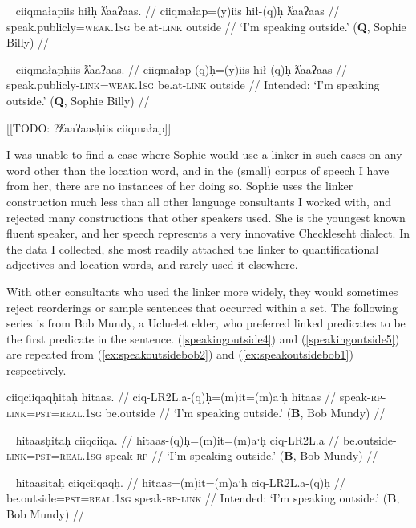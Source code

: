 \ex~ \label{speakingoutside2}
\begingl
\glpreamble ciiqmałapiis hiłḥ ƛ̓aaʔaas. //
\gla ciiqmałap=(y)iis hił-(q)ḥ ƛ̓aaʔaas //
\glb speak.publicly=\textsc{weak.1sg} be.at-\textsc{link} outside //
\glft `I'm speaking outside.' (\textbf{Q}, Sophie Billy) //
\endgl
\xe

\ex~ \label{*speakingoutside3}
\begingl
\glpreamble *ciiqmałapḥiis ƛ̓aaʔaas. //
\gla ciiqmałap-(q)ḥ=(y)iis hił-(q)ḥ ƛ̓aaʔaas //
\glb speak.publicly-\textsc{link}=\textsc{weak.1sg} be.at-\textsc{link} outside //
\glft Intended: `I'm speaking outside.' (\textbf{Q}, Sophie Billy) //
\endgl
\xe

[[TODO: ?ƛ̓aaʔaasḥiis ciiqmałap]]

I was unable to find a case where Sophie would use a linker in such cases on any word other than the location word, and in the (small) corpus of speech I have from her, there are no instances of her doing so. Sophie uses the linker construction much less than all other language consultants I worked with, and rejected many constructions that other speakers used. She is the youngest known fluent speaker, and her speech represents a very innovative Checkleseht dialect. In the data I collected, she most readily attached the linker to quantificational adjectives and location words, and rarely used it elsewhere.

With other consultants who used the linker more widely, they would sometimes reject reorderings or sample sentences that occurred within a set. The following series is from Bob Mundy, a Ucluelet elder, who preferred linked predicates to be the first predicate in the sentence. (\ref{speakingoutside4}) and (\ref{speakingoutside5}) are repeated from (\ref{ex:speakoutsidebob2}) and (\ref{ex:speakoutsidebob1}) respectively.

\ex \label{speakingoutside4}
\begingl
\glpreamble ciiqciiqaqḥitaḥ hitaas. //
\gla ciq-LR2L.a-(q)ḥ=(m)it=(m)aˑḥ hitaas //
\glb speak-\textsc{rp}-\textsc{link}=\textsc{pst}=\textsc{real.1sg} be.outside //
\glft `I'm speaking outside.' (\textbf{B}, Bob Mundy) //
\endgl
\xe

\ex~ \label{speakingoutside5}
\begingl
\glpreamble hitaasḥitaḥ ciiqciiqa. //
\gla hitaas-(q)ḥ=(m)it=(m)aˑḥ ciq-LR2L.a //
\glb be.outside-\textsc{link}=\textsc{pst}=\textsc{real.1sg} speak-\textsc{rp} //
\glft `I'm speaking outside.' (\textbf{B}, Bob Mundy) //
\endgl
\xe

\ex~ \label{speakingoutside6}
\begingl
\glpreamble *hitaasitaḥ ciiqciiqaqḥ. //
\gla hitaas=(m)it=(m)aˑḥ ciq-LR2L.a-(q)ḥ //
\glb be.outside=\textsc{pst}=\textsc{real.1sg} speak-\textsc{rp}-\textsc{link} //
\glft Intended: `I'm speaking outside.' (\textbf{B}, Bob Mundy) //
\endgl
\xe

